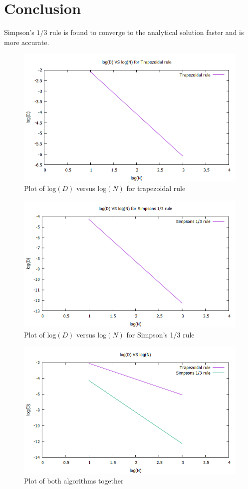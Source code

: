 \documentclass[12pt,a4paper,fleqn]{article}
\begin{document}
	\section*{Conclusion}
	Simpson's $1/3$ rule is found to converge to the analytical solution faster and is more accurate.
	
	\begin{figure}[!hbp]
		\includegraphics[width=\textwidth]{trapezoidal.png}
		\caption{Plot of log$(D)$ versus log$(N)$ for trapezoidal rule}
	\end{figure}
	
	\begin{figure}[!]
		\includegraphics[width=\textwidth]{simpsons13.png}
		\caption{Plot of log$(D)$ versus log$(N)$ for Simpson's 1/3 rule}
	\end{figure}

	\begin{figure}[!]
	\includegraphics[width=\textwidth]{both.png}
	\caption{Plot of both algorithms together}
	\end{figure}
	
\end{document}
